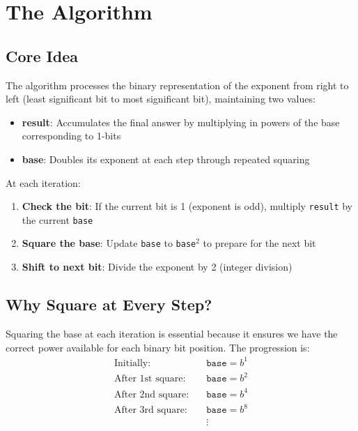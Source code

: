 \documentclass{article}
\begin{document}
	\section{The Algorithm}
	
	\subsection{Core Idea}
	
	The algorithm processes the binary representation of the exponent from right to left (least significant bit to most significant bit), maintaining two values:
	\begin{itemize}[itemsep=2pt]
		\item \textbf{result}: Accumulates the final answer by multiplying in powers of the base corresponding to 1-bits
		\item \textbf{base}: Doubles its exponent at each step through repeated squaring
	\end{itemize}
	
	At each iteration:
	\begin{enumerate}[itemsep=2pt]
		\item \textbf{Check the bit}: If the current bit is 1 (exponent is odd), multiply \texttt{result} by the current \texttt{base}
		\item \textbf{Square the base}: Update \texttt{base} to \texttt{base}$^2$ to prepare for the next bit
		\item \textbf{Shift to next bit}: Divide the exponent by 2 (integer division)
	\end{enumerate}
	
	\subsection{Why Square at Every Step?}
	
	Squaring the base at each iteration is essential because it ensures we have the correct power available for each binary bit position. The progression is:
	\begin{align*}
		\text{Initially:} \quad & \texttt{base} = b^1 \\
		\text{After 1st square:} \quad & \texttt{base} = b^2 \\
		\text{After 2nd square:} \quad & \texttt{base} = b^4 \\
		\text{After 3rd square:} \quad & \texttt{base} = b^8 \\
		& \vdots
	\end{align*}
	
\end{document}
